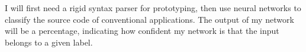 I will first need a rigid syntax parser for prototyping, then use neural networks to classify the source code of conventional applications.
The output of my network will be a percentage, indicating how confident my network is that the input belongs to a given label.



%
%
